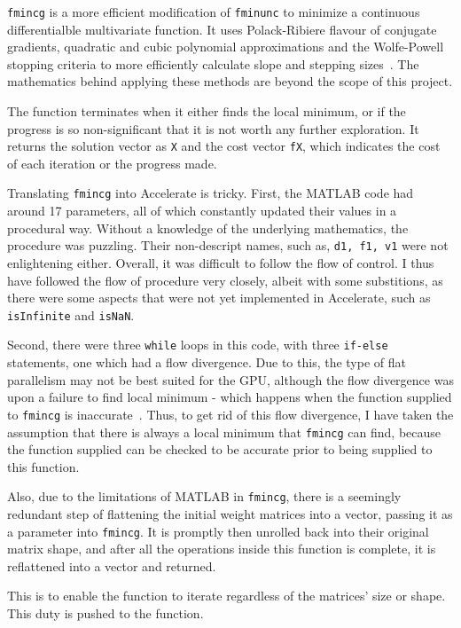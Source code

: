 \texttt{fmincg} is a more efficient modification of \texttt{fminunc} to minimize a continuous differentialble multivariate function. It uses Polack-Ribiere flavour of conjugate gradients, quadratic and cubic polynomial approximations and the Wolfe-Powell stopping criteria to more efficiently calculate slope and stepping sizes~\cite{Mat17}. The mathematics behind applying these methods are beyond the scope of this project.

The function terminates when it either finds the local minimum, or if the progress is so non-significant that it is not worth any further exploration. It returns the solution vector as \texttt{X} and the cost vector \texttt{fX}, which indicates the cost of each iteration or the progress made.

Translating \texttt{fmincg} into Accelerate is tricky. First, the MATLAB code had around 17 parameters, all of which constantly updated their values in a procedural way. Without a knowledge of the underlying mathematics, the procedure was puzzling. Their non-descript names, such as, \texttt{d1, f1, v1} were not enlightening either. Overall, it was difficult to follow the flow of control. I thus have followed the flow of procedure very closely, albeit with some substitions, as there were some aspects that were not yet implemented in Accelerate, such as \texttt{isInfinite} and \texttt{isNaN}. 

Second, there were three \texttt{while} loops in this code, with three \texttt{if-else} statements, one which had a flow divergence. Due to this, the type of flat parallelism may not be best suited for the GPU, although the flow divergence was upon a failure to find local minimum - which happens when the function supplied to \texttt{fmincg} is inaccurate~\cite{Reb13}. Thus, to get rid of this flow divergence, I have taken the assumption that there is always a local minimum that \texttt{fmincg} can  find, because the function supplied can be checked to be accurate prior to being supplied to this function.

Also, due to the limitations of MATLAB in \texttt{fmincg}, there is a seemingly redundant step of flattening the initial weight matrices into a vector, passing it as a parameter into \texttt{fmincg}. It is promptly then unrolled back into their original matrix shape, and after all the operations inside this function is complete, it is reflattened into a vector and returned.

This is to enable the function to iterate regardless of the matrices' size or shape. This duty is pushed to the function.

